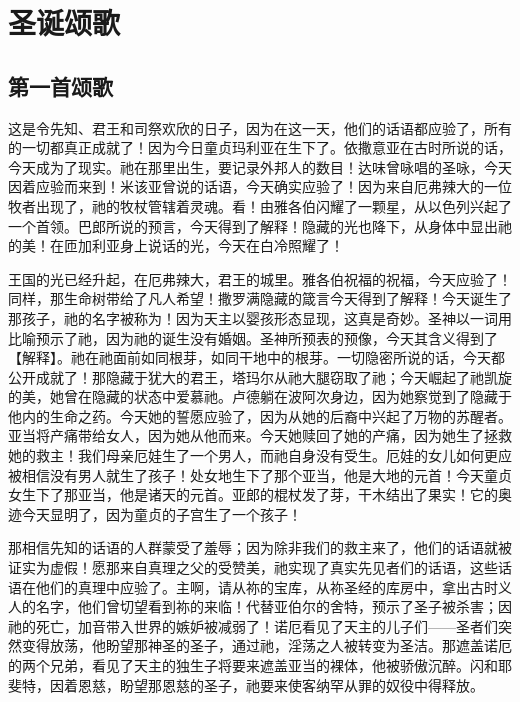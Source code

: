 
\chapter{圣诞颂歌}



\section{第一首颂歌}

这是令先知、君王和司祭欢欣的日子，因为在这一天，他们的话语都应验了，所有的一切都真正成就了！因为今日童贞玛利亚在生下了。依撒意亚在古时所说的话，今天成为了现实。祂在那里出生，要记录外邦人的数目！达味曾咏唱的圣咏，今天因着应验而来到！米该亚曾说的话语，今天确实应验了！因为来自厄弗辣大的一位牧者出现了，祂的牧杖管辖着灵魂。看！由雅各伯闪耀了一颗星，从以色列兴起了一个首领。巴郎所说的预言，今天得到了解释！隐藏的光也降下，从身体中显出祂的美！在匝加利亚身上说话的光，今天在白冷照耀了！\par

王国的光已经升起，在厄弗辣大，君王的城里。雅各伯祝福的祝福，今天应验了！同样，那生命树带给了凡人希望！撒罗满隐藏的箴言今天得到了解释！今天诞生了那孩子，祂的名字被称为！因为天主以婴孩形态显现，这真是奇妙。圣神以一词用比喻预示了祂，因为祂的诞生没有婚姻。圣神所预表的预像，今天其含义得到了【解释】。祂在祂面前如同根芽，如同干地中的根芽。一切隐密所说的话，今天都公开成就了！那隐藏于犹大的君王，塔玛尔从祂大腿窃取了祂；今天崛起了祂凯旋的美，她曾在隐藏的状态中爱慕祂。卢德躺在波阿次身边，因为她察觉到了隐藏于他内的生命之药。今天她的誓愿应验了，因为从她的后裔中兴起了万物的苏醒者。亚当将产痛带给女人，因为她从他而来。今天她赎回了她的产痛，因为她生了拯救她的救主！我们母亲厄娃生了一个男人，而祂自身没有受生。厄娃的女儿如何更应被相信没有男人就生了孩子！处女地生下了那个亚当，他是大地的元首！今天童贞女生下了那亚当，他是诸天的元首。亚郎的棍杖发了芽，干木结出了果实！它的奥迹今天显明了，因为童贞的子宫生了一个孩子！\par

那相信先知的话语的人群蒙受了羞辱；因为除非我们的救主来了，他们的话语就被证实为虚假！愿那来自真理之父的受赞美，祂实现了真实先见者们的话语，这些话语在他们的真理中应验了。主啊，请从祢的宝库，从祢圣经的库房中，拿出古时义人的名字，他们曾切望看到祢的来临！代替亚伯尔的舍特，预示了圣子被杀害；因祂的死亡，加音带入世界的嫉妒被减弱了！诺厄看见了天主的儿子们——圣者们突然变得放荡，他盼望那神圣的圣子，通过祂，淫荡之人被转变为圣洁。那遮盖诺厄的两个兄弟，看见了天主的独生子将要来遮盖亚当的裸体，他被骄傲沉醉。闪和耶斐特，因着恩慈，盼望那恩慈的圣子，祂要来使客纳罕从罪的奴役中得释放。\par

